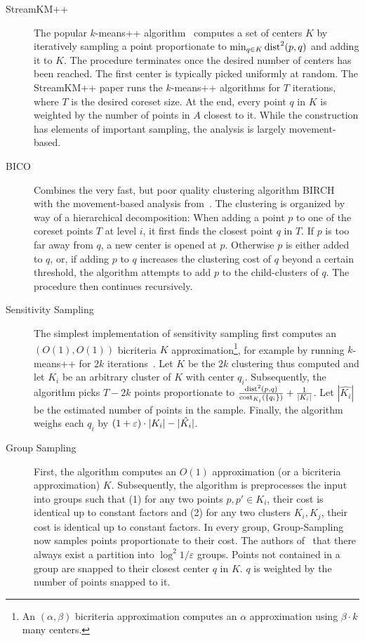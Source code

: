 \begin{description}
\item[StreamKM++~\cite{AckermannMRSLS12}] The popular $k$-means++ algorithm~\cite{ArV07} computes a set of centers $K$ by iteratively sampling a point proportionate to $\min_{q\in K} \text{dist}^2(p,q)$ and adding it to $K$. The procedure terminates once the desired number of centers has been reached. The first center is typically picked uniformly at random.
The StreamKM++ paper runs the $k$-means++ algorithms for $T$ iterations, where $T$ is the desired coreset size. At the end, every point $q$ in $K$ is weighted by the number of points in $A$ closest to it. While the construction has elements of important sampling, the analysis is largely movement-based.
\item[BICO~\cite{FGSSS13}] Combines the very fast, but poor quality clustering algorithm BIRCH~\cite{ZRL97} with the movement-based analysis from~\cite{FrahlS2005,HaM04}. The clustering is organized by way of a hierarchical decomposition: When adding a point $p$ to one of the coreset points $T$ at level $i$, it first finds the closest point $q$ in $T$. If $p$ is too far away from $q$, a new center is opened at $p$. Otherwise $p$ is either added to $q$, or, if adding $p$ to $q$ increases the clustering cost of $q$ beyond a certain threshold, the algorithm attempts to add $p$ to the child-clusters of $q$. The procedure then continues recursively. 
\item[Sensitivity Sampling~\cite{FL11}] The simplest implementation of sensitivity sampling first computes an $(O(1),O(1))$ bicriteria $K$ approximation\footnote{An $(\alpha,\beta)$ bicriteria approximation computes an $\alpha$ approximation using $\beta\cdot k$ many centers.}, for example by running $k$-means++ for $2k$ iterations~\cite{Wei16}. Let $K$ be the $2k$ clustering thus computed and let $K_i$ be an arbitrary cluster of $K$ with center $q_i$. Subsequently, the algorithm picks $T-2k$ points proportionate to $\frac{\text{dist}^2(p,q)}{\text{cost}_{K_i}(\{q_i\})} + \frac{1}{|K_i|}$. Let $|\hat{K_i}|$ be the estimated number of points in the sample. Finally, the algorithm weighs each $q_i$ by $(1+\varepsilon)\cdot |K_i| - |\hat{K_i}|$.
\item[Group Sampling~\cite{Cohen-AddadSS21}] First, the algorithm computes an $O(1)$ approximation (or a bicriteria approximation) $K$. Subsequently, the algorithm is preprocesses the input into groups such that (1) for any two points $p,p'\in K_i$, their cost is identical up to constant factors and (2) for any two clusters $K_i,K_j$, their cost is identical up to constant factors. In every group, Group-Sampling now samples points proportionate to their cost. The authors of~\cite{Cohen-AddadSS21} that there always exist a partition into $\log^2 1/\varepsilon$ groups. Points not contained in a group are snapped to their closest center $q$ in $K$. $q$ is weighted by the number of points snapped to it.
\end{description}

